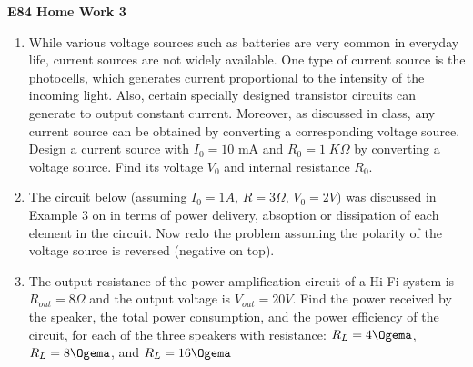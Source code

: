 \usepackage{html}

\begin{center}
{\Large \bf E84 Home Work 3}
\end{center}
\begin{enumerate}

\item While various voltage sources such as batteries are very common 
in everyday life, current sources are not widely available. One type of
current source is the photocells, which generates current proportional 
to the intensity of the incoming light. Also, certain specially designed
transistor circuits can generate to output constant current. Moreover, 
as discussed in class, any current source can be obtained by converting
a corresponding voltage source. Design a current source with $I_0=10$ mA 
and $R_0=1\;K\Omega$ by converting a voltage source. Find its voltage 
$V_0$ and internal resistance $R_0$. 


\item The circuit below (assuming $I_0=1A$, $R=3\Omega$, $V_0=2V$) was
discussed in Example 3 on 
 in terms of power delivery, absoption or dissipation 
of each element in the circuit. Now redo the problem assuming the polarity
of the voltage source is reversed (negative on top). 



\item The output resistance of the power amplification circuit of
  a Hi-Fi system is $R_{out}=8\Omega$ and the output voltage is 
  $V_{out}=20V$. Find the power received by the speaker, the total
  power consumption, and the power efficiency of the circuit, for 
  each of the three speakers with resistance: $R_L=4\Ogema$, 
  $R_L=8\Ogema$, and $R_L=16\Ogema$


\end{enumerate}

